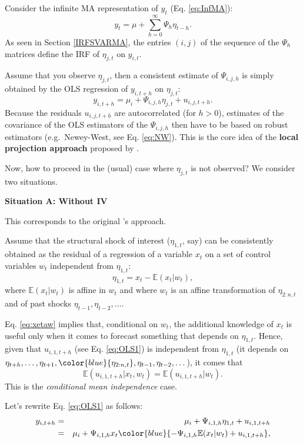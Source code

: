 \documentclass[
  12pt,
]{book}
\theoremstyle{definition}
\theoremstyle{definition}
\theoremstyle{definition}
\theoremstyle{definition}
\theoremstyle{remark}
\begin{document}
Consider the infinite MA representation of \(y_t\) (Eq. \eqref{eq:InfMA}):
\[
y_t = \mu + \sum_{h=0}^\infty \Psi_{h} \eta_{t-h}.
\]
As seen in Section \ref{IRFSVARMA}, the entries \((i,j)\) of the sequence of the \(\Psi_h\) matrices define the IRF of \(\eta_{j,t}\) on \(y_{i,t}\).

Assume that you observe \(\eta_{j,t}\), then a consistent estimate of \(\Psi_{i,j,h}\) is simply obtained by the OLS regression of \(y_{i,t+h}\) on \(\eta_{j,t}\):
\begin{equation}
y_{i,t+h} = \mu_i + \Psi_{i,j,h}\eta_{j,t} + u_{i,j,t+h}.\label{eq:OLS1}
\end{equation}
Because the residuals \(u_{i,j,t+h}\) are autocorrelated (for \(h>0\)), estimates of the covariance of the OLS estimators of the \(\Psi_{i,j,h}\) then have to be based on robust estimators (e.g.~Newey-West, see Eq. \eqref{eq:NW}). This is the core idea of the \textbf{local projection approach} proposed by \citet{Jorda_2005}.

Now, how to proceed in the (usual) case where \(\eta_{j,t}\) is not observed? We consider two situations.

\textbf{Situation A: Without IV}

This corresponds to the original \citet{Jorda_2005}'s approach.

Assume that the structural shock of interest (\(\eta_{1,t}\), say) can be consistently obtained as the residual of a regression of a variable \(x_t\) on a set of control variables \(w_t\) independent from \(\eta_{1,t}\):
\begin{equation}
\eta_{1,t} = x_t - \mathbb{E}(x_t|w_t),\label{eq:xetaw}
\end{equation}
where \(\mathbb{E}(x_t|w_t)\) is affine in \(w_t\) and where \(w_t\) is an affine transformation of \(\eta_{2:n,t}\) and of past shocks \(\eta_{t-1},\eta_{t-2},\dots\).

Eq. \eqref{eq:xetaw} implies that, conditional on \(w_t\), the additional knowledge of \(x_t\) is useful only when it comes to forecast something that depends on \(\eta_{1,t}\). Hence, given that \(u_{i,1,t+h}\) (see Eq. \eqref{eq:OLS1}) is independent from \(\eta_{1,t}\) (it depends on \(\eta_{t+h},\dots,\eta_{t+1},\color{blue}{\eta_{2:n,t}},\eta_{t-1},\eta_{t-2},\dots\)), it comes that
\[
\mathbb{E}(u_{i,1,t+h}|x_t,w_t)= \mathbb{E}(u_{i,1,t+h}|w_t).
\]
This is the \emph{conditional mean independence} case.

Let's rewrite Eq. \eqref{eq:OLS1} as follows:
\begin{eqnarray*}
y_{i,t+h} &=& \mu_i + \Psi_{i,1,h}\eta_{1,t} + u_{i,1,t+h}\\
&=&  \mu_i + \Psi_{i,1,h}x_t  \color{blue}{-\Psi_{i,1,h}\mathbb{E}(x_t|w_t) + u_{i,1,t+h}},
\end{eqnarray*}
\end{document}
